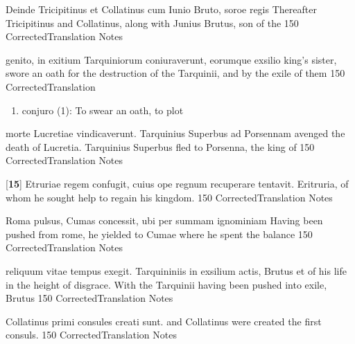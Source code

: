 \latline
  {Deinde Tricipitinus et Collatinus cum Iunio Bruto, soroe regis}
  { Thereafter Tricipitinus and Collatinus, along with Junius Brutus, son of the  }
  {150}
  { CorrectedTranslation }
  { Notes }


\latline
  {genito, in exitium Tarquiniorum coniuraverunt, eorumque exsilio}
  { king's sister, swore an oath for the destruction of the Tarquinii, and by the exile of them }
  {150}
  { CorrectedTranslation }
  { \begin{enumerate}
  	\item conjuro (1):  To swear an oath, to plot
  \end{enumerate} }


\latline
  {morte Lucretiae vindicaverunt.  Tarquinius Superbus ad Porsennam}
  { avenged the death of Lucretia.  Tarquinius Superbus fled to Porsenna, the king of  }
  {150}
  { CorrectedTranslation }
  { Notes }


\latline
  {[\textbf{15}] Etruriae regem confugit, cuius ope regnum recuperare tentavit.}
  { Eritruria, of whom he sought help to regain his kingdom. }
  {150}
  { CorrectedTranslation }
  { Notes }


\latline
  {Roma pulsus, Cumas concessit, ubi per summam ignominiam}
  { Having been pushed from rome, he yielded to Cumae where he spent the balance }
  {150}
  { CorrectedTranslation }
  { Notes }


\latline
  {reliquum vitae tempus exegit.  Tarquininiis in exsilium actis, Brutus et}
  { of his life in the height of disgrace.  With the Tarquinii having been pushed into exile, Brutus }
  {150}
  { CorrectedTranslation }
  { Notes }


\latline
  {Collatinus primi consules creati sunt.}
  { and Collatinus were created the first consuls. }
  {150}
  { CorrectedTranslation }
  { Notes }





